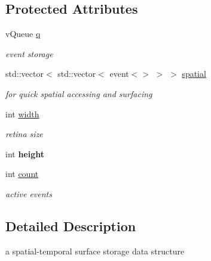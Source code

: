 \subsection*{Protected Attributes}
\begin{DoxyCompactItemize}
\item 
\mbox{\label{classev_1_1vSurface2_ad26e2a77d859924e39526fe69ad6e8bf}} 
v\+Queue \hyperlink{classev_1_1vSurface2_ad26e2a77d859924e39526fe69ad6e8bf}{q}
\begin{DoxyCompactList}\small\item\em event storage \end{DoxyCompactList}\item 
\mbox{\label{classev_1_1vSurface2_aeea3647a3da9c08bd0f3bd577e6ba443}} 
std\+::vector$<$ std\+::vector$<$ event$<$$>$ $>$ $>$ \hyperlink{classev_1_1vSurface2_aeea3647a3da9c08bd0f3bd577e6ba443}{spatial}
\begin{DoxyCompactList}\small\item\em for quick spatial accessing and surfacing \end{DoxyCompactList}\item 
\mbox{\label{classev_1_1vSurface2_a1aa8027816352a15d5b9bf1f26f48e76}} 
int \hyperlink{classev_1_1vSurface2_a1aa8027816352a15d5b9bf1f26f48e76}{width}
\begin{DoxyCompactList}\small\item\em retina size \end{DoxyCompactList}\item 
\mbox{\label{classev_1_1vSurface2_a4cac3483eefdbe9e83ced2ef6bc5f7b2}} 
int {\bfseries height}
\item 
\mbox{\label{classev_1_1vSurface2_a53cfa9932bf60007440cbf535c115222}} 
int \hyperlink{classev_1_1vSurface2_a53cfa9932bf60007440cbf535c115222}{count}
\begin{DoxyCompactList}\small\item\em active events \end{DoxyCompactList}\end{DoxyCompactItemize}


\subsection{Detailed Description}
a spatial-\/temporal surface storage data structure 

